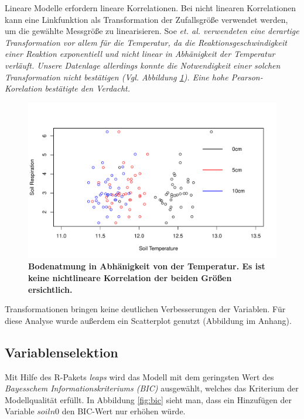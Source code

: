 Lineare Modelle erfordern lineare Korrelationen.
Bei nicht linearen Korrelationen kann eine Linkfunktion als Transformation der Zufallsgröße verwendet werden, um die gewählte Messgröße zu linearisieren.
Soe \it{et. al.} verwendeten eine derartige Transformation vor allem für die Temperatur, da die Reaktionsgeschwindigkeit einer Reaktion exponentiell und nicht linear in Abhänigkeit der Temperatur verläuft.
Unsere Datenlage allerdings konnte die Notwendigkeit einer solchen Transformation nicht bestätigen (Vgl. Abbildung \ref{fig:temp}).
Eine hohe \it{Pearson}-Korelation bestätigte den Verdacht.
\begin{figure}
	\centering
	\includegraphics[width=\textwidth]{fig/model/temp-vs-resp.pdf}
	\caption{\bf{Bodenatmung in Abhänigkeit von der Temperatur.}
		 Es ist keine nichtlineare Korrelation der beiden Größen ersichtlich. }
	\label{fig:temp}
\end{figure}
Transformationen bringen keine deutlichen Verbesserungen der Variablen. 
Für diese Analyse wurde außerdem ein Scatterplot genutzt (Abbildung im Anhang).


\subsection{Variablenselektion}

Mit Hilfe des R-Pakets \emph{leaps} wird das Modell mit dem geringsten Wert des \emph{Bayesschem Informationskriteriums (BIC)} ausgewählt, welches das Kriterium der Modellqualität erfüllt.
In Abbildung \ref{fig:bic} sieht man, dass ein Hinzufügen der Variable $soiln0$ den BIC-Wert nur erhöhen würde.

